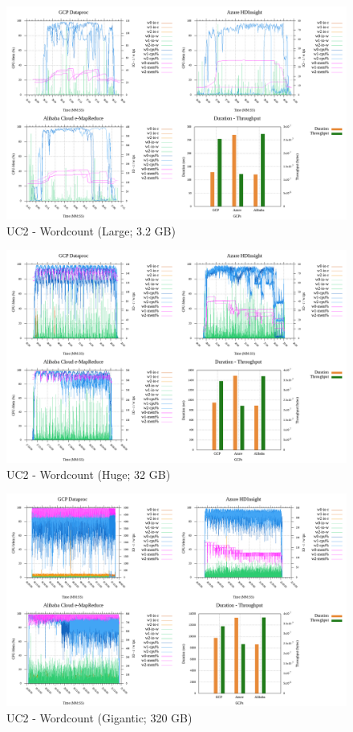 \documentclass[review]{elsarticle}
\begin{document}
\begin{figure}[p]
	\caption{UC2 - Wordcount (Large; 3.2 GB)}
	\label{fig:uc2-wrdcnt-l-cmidt}
	\includegraphics[width=\textwidth]{uc2-wrdcnt-l-cmidt}
	\centering
\end{figure}

\begin{figure}[p]
	\caption{UC2 - Wordcount (Huge; 32 GB)}
	\label{fig:uc2-wrdcnt-h-cmidt}
	\includegraphics[width=\textwidth]{uc2-wrdcnt-h-cmidt}
	\centering
\end{figure}

\begin{figure}[p]
	\caption{UC2 - Wordcount (Gigantic; 320 GB)}
	\label{fig:uc2-wrdcnt-g-cmidt}
	\includegraphics[width=\textwidth]{uc2-wrdcnt-g-cmidt}
	\centering
\end{figure}
\end{document}
